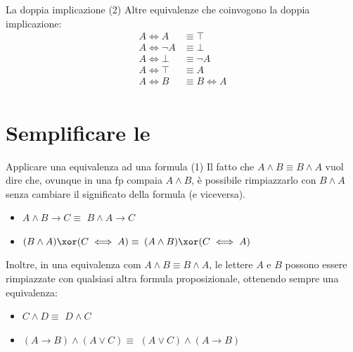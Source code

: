 \documentclass[10pt,dvipsnames,handout]{beamer}
\begin{document}
\begin{frame}{La doppia implicazione (2)}
    Altre equivalenze che coinvogono la doppia implicazione:
    \begin{align*}
        A \iff A      & \equiv \top     \\
        A \iff \neg A & \equiv \bot     \\
        A \iff \bot   & \equiv \neg A   \\
        A \iff \top   & \equiv A        \\
        A \iff B      & \equiv B \iff A \\
    \end{align*}
\end{frame}


\section{Semplificare le \fp}

\begin{frame}{Applicare una equivalenza ad una formula (1)}
    Il fatto che $A \wedge B \equiv B \wedge A$ vuol dire che, ovunque in una fp compaia $A \wedge B$, è possibile rimpiazzarlo con $B \wedge A$ senza cambiare il significato della formula (e viceversa).
    \begin{itemize}
        \item $A \wedge B \to C \equiv$ \pause $B \wedge A \to C$ \pause\
        \item $(B \wedge A) \xor (C \iff A) \equiv$ \pause $(A \wedge B) \xor (C \iff A)$
    \end{itemize}

    \pause
    \medskip
    Inoltre, in una equivalenza com $A \wedge B \equiv B \wedge A$, le lettere $A$ e $B$ possono essere rimpiazzate con qualsiasi altra formula proposizionale, ottenendo sempre una equivalenza:
    \begin{itemize}
        \item $C \wedge D \equiv$ \pause $D \wedge C$ \\
        \item $(A \to B) \wedge (A \vee C) \equiv$ \pause $(A \vee C) \wedge (A \to B)$
    \end{itemize}
\end{frame}
\end{document}
